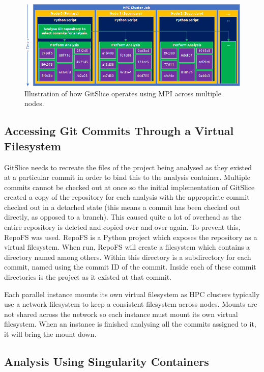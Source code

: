 \begin{figure}[ht]
	\centering
	\includegraphics[width=\textwidth]{images/mpi_diagram}
	\caption{Illustration of how GitSlice operates using MPI across multiple nodes.}
\label{fig:mpi_diagram}
\end{figure}

\subsection{Accessing Git Commits Through a Virtual Filesystem}
\label{subsec:filesystem}

GitSlice needs to recreate the files of the project being analysed as they existed at a particular commit in order to bind this to the analysis container.
Multiple commits cannot be checked out at once so the initial implementation of GitSlice created a copy of the repository for each analysis with the appropriate commit checked out in a detached  state (this means a commit has been checked out directly, as opposed to a branch).
This caused quite a lot of overhead as the entire repository is deleted and copied over and over again.
To prevent this, RepoFS\cite{repofs} was used.
RepoFS is a Python project which exposes the repository as a virtual filesystem.
When run, RepoFS will create a filesystem which contains a directory named  among others.
Within this directory is a subdirectory for each commit, named using the commit ID of the commit.
Inside each of these commit directories is the project as it existed at that commit.

Each parallel instance mounts its own virtual filesystem as HPC clusters typically use a network filesystem to keep a consistent filesystem across nodes.
Mounts are not shared across the network so each instance must mount its own virtual filesystem.
When an instance is finished analysing all the commits assigned to it, it will bring the mount down.

\subsection{Analysis Using Singularity Containers}
\label{subsec:singularity}

